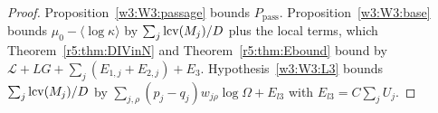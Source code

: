 \begin{proof}
Proposition~\ref{w3:W3:passage} bounds $P_{\mathrm{pass}}$. Proposition~\ref{w3:W3:base} bounds $\mu_0-\langle\log\kappa\rangle$ by $\sum_j\operatorname{lcv}(M_j)/D$ plus the local terms, which Theorem~\ref{r5:thm:DIVinN} and Theorem~\ref{r5:thm:Ebound} bound by $\mathcal L+LG+\sum_j(E_{1,j}+E_{2,j})+E_3$. Hypothesis~\ref{w3:W3:L3} bounds $\sum_j\operatorname{lcv}(M_j)/D$ by $\sum_{j,\rho}(p_j-q_j)w_{j\rho}\log\Omega+E_{l3}$ with $E_{l3}=C\sum_jU_j$.
\end{proof}

